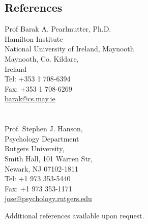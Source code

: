 \documentclass[12pt,overlapped,line]{res}
\begin{document}
\begin{resume}
 \section{References}
  \begin{multicols}{2}
 {\small
    Prof Barak A. Pearlmutter, Ph.D. \\
    Hamilton Institute \\
    National University of Ireland, Maynooth \\
    Maynooth, Co. Kildare, \\
    Ireland \\
    Tel: +353 1 708-6394\\
    Fax: +353 1 708-6269\\
    \url{barak@cs.may.ie} \\
\\
\\
    Prof. Stephen J. Hanson, \\
    Psychology Department \\
    Rutgers University, \\
    Smith Hall, 101 Warren Str, \\
    Newark, NJ 07102-1811 \\
    Tel: +1 973 353-5440 \\
    Fax: +1 973 353-1171 \\
    \url{jose@psychology.rutgers.edu} \\
 }
 \end{multicols}

Additional references available upon request.



\end{resume}
\end{document}
